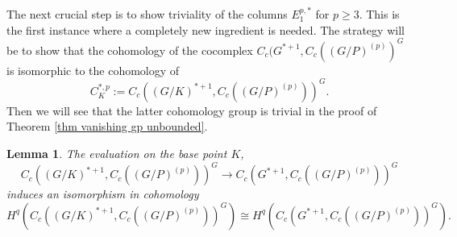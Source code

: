 \documentclass[a4paper]{amsart}
\newtheorem{lem}{Lemma}[section]
\theoremstyle{definition}
\newtheorem{dfn}[lem]{Definition}
\theoremstyle{remark}
\theoremstyle{TheoremNum}
\begin{document}
The next crucial step is to show triviality of the columns $E^{p,\ast}_1$ for $p\geq 3$. This is the first instance where a completely new ingredient is needed. The strategy will be to show  that the cohomology of the cocomplex $C_c(G^{*+1},C_c((G/P)^{(p)})^G$ is isomorphic to the cohomology of 
\begin{equation}\label{def Cpq}
C_K^{*,p}:=C_c((G/K)^{*+1},C_c((G/P)^{(p)}))^G.
\end{equation}
Then we will see that the latter cohomology group is trivial in the proof of Theorem \ref{thm vanishing gp unbounded}.


\begin{lem}\label{K invariant representative}
The evaluation on the base point $K$, 
$$C_c((G/K)^{*+1},C_c((G/P)^{(p)}))^G\longrightarrow  C_c(G^{*+1},C_c((G/P)^{(p)}))^G$$
induces an isomorphism in cohomology
$$ H^q(C_c((G/K)^{*+1},C_c((G/P)^{(p)}))^G)\cong H^q( C_c(G^{*+1},C_c((G/P)^{(p)}))^G).$$
\end{lem}
\end{document}
